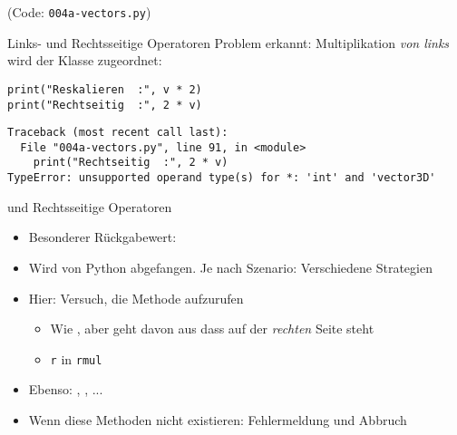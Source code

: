 
\begin{frame}
%
\begin{center}
	(Code: \texttt{004a-vectors.py})
\end{center}
%
\end{frame}


\begin{frame}[fragile]{Links- und Rechtsseitige Operatoren}
%
Problem erkannt: Multiplikation \emph{von links} wird der Klasse  zugeordnet:
\begin{warnbox}[Beispiel: Title goes here, leftupper=6mm]
\begin{verbatim}
print("Reskalieren  :", v * 2)
print("Rechtseitig  :", 2 * v)
\end{verbatim}
\end{warnbox}
%
\begin{cmdbox}
\begin{verbatim}
Traceback (most recent call last):
  File "004a-vectors.py", line 91, in <module>
    print("Rechtseitig  :", 2 * v)
TypeError: unsupported operand type(s) for *: 'int' and 'vector3D'
\end{verbatim}
\end{cmdbox}
%
\end{frame}


\begin{frame}[fragile]{ und Rechtsseitige Operatoren}
%
\begin{itemize}
\item Besonderer Rückgabewert: 
\item Wird von Python abgefangen. Je nach Szenario: Verschiedene Strategien
\item Hier: Versuch, die Methode  aufzurufen
	\begin{itemize}
	\item Wie , aber geht davon aus dass  auf der \emph{rechten} Seite steht
	\item[\Thus] \texttt{r} in \texttt{rmul}
	\end{itemize}
\item Ebenso: , , ...
\item Wenn diese Methoden nicht existieren: Fehlermeldung und Abbruch
\end{itemize}
%
\end{frame}

